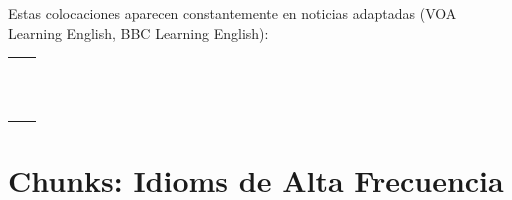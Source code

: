 \documentclass[12pt,a4paper]{article}
\begin{document}
\begin{cajachunk}
Estas colocaciones aparecen constantemente en noticias adaptadas (VOA Learning English, BBC Learning English):

\medskip
\begin{tabularx}{\textwidth}{@{} X l @{}}
\eng{break the news} & \esp{dar la noticia} \\
\eng{take action} & \esp{tomar medidas} \\
\eng{raise awareness} & \esp{crear conciencia} \\
\eng{make a statement} & \esp{hacer una declaración} \\
\eng{hold a meeting} & \esp{celebrar una reunión} \\
\eng{reach an agreement} & \esp{llegar a un acuerdo} \\
\eng{face a problem} & \esp{enfrentar un problema} \\
\eng{play a role} & \esp{desempeñar un papel} \\
\eng{have an impact on} & \esp{tener un impacto en} \\
\eng{pay attention to} & \esp{prestar atención a} \\
\eng{according to} & \esp{según} \\
\eng{as a result} & \esp{como resultado} \\
\end{tabularx}
\end{cajachunk}

\section{Chunks: Idioms de Alta Frecuencia}
\end{document}
